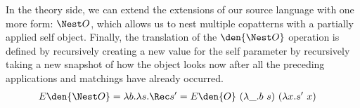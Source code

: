 In the theory side, we can extend the extensions of our source language with one more form: $\Nest O$, which allows us to nest multiple copatterns with a partially applied self object. 
Finally, the translation of the $\den{\Nest O}$ operation is defined by recursively creating a new value for the self parameter by recursively taking a new snapshot of how the object looks now after all the preceding applications and matchings have already occurred.
\begin{align*}
  E\den{\Nest O}
  &=
  \lambda b. \lambda s. \Rec s' = E\den{O} ~ (\lambda \_. b ~ s) ~ (\lambda x. s' ~ x)
\end{align*}


